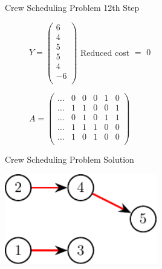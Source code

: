 \documentclass{beamer}
\begin{document}
\begin{frame}{Crew Scheduling Problem}
    12th Step
    \begin{figure}[!htb]
        \begin{minipage}{0.48\textwidth}
            \centering
            $Y = \begin{pmatrix} 6\\ 4\\ 5\\ 5\\ 4\\ -6\\ \end{pmatrix}$
                Reduced cost $=$ $0$
            \end{minipage}
        \begin{minipage}{0.48\textwidth}
            $A = \begin{pmatrix}
                \ldots & 0 & 0 & 0 & 1 & 0 \\
                \ldots & 1 & 1 & 0 & 0 & 1 \\
                \ldots & 0 & 1 & 0 & 1 & 1 \\
                \ldots & 1 & 1 & 1 & 0 & 0 \\
                \ldots & 1 & 0 & 1 & 0 & 0 \\
            \end{pmatrix}$
        \end{minipage}
    \end{figure}
\end{frame}

\begin{frame}{Crew Scheduling Problem}
    Solution

        \begin{center}
        {
        \centering
        \includegraphics[width=0.5\textwidth]{graph666.pdf}
        }
        \end{center}
\end{frame}
\end{document}

